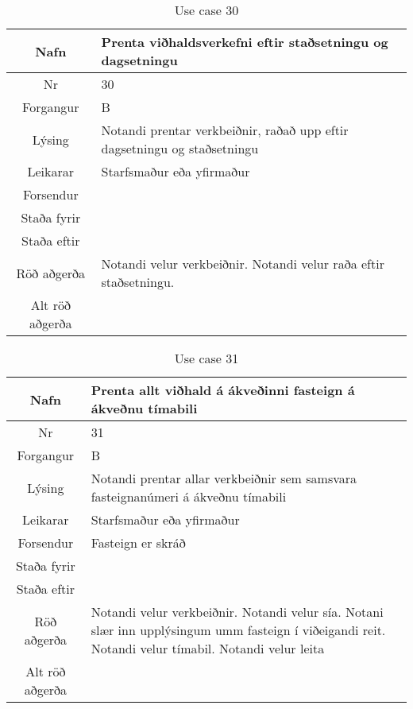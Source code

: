 \begin{table}[h!]\centering
\begin{tabular}{|c|p{10cm}|}
\hline
Nafn&Prenta viðhaldsverkefni eftir staðsetningu og dagsetningu\\
\hline
Nr&30\\
\hline
Forgangur&B\\
\hline
Lýsing&Notandi prentar verkbeiðnir, raðað upp eftir dagsetningu og staðsetningu\\
\hline
Leikarar&Starfsmaður eða yfirmaður\\
\hline
Forsendur&\\
\hline
Staða fyrir&\\
\hline
Staða eftir&\\
\hline
Röð aðgerða&Notandi velur verkbeiðnir. Notandi velur raða eftir staðsetningu.\\
\hline
Alt röð aðgerða&\\
\hline
\end{tabular}
\caption{Use case 30}\label{tab:use_case_30}
\end{table}
\begin{table}[h!]\centering
\begin{tabular}{|c|p{10cm}|}
\hline
Nafn&Prenta allt viðhald á ákveðinni fasteign á ákveðnu tímabili\\
\hline
Nr&31\\
\hline
Forgangur&B\\
\hline
Lýsing&Notandi prentar allar verkbeiðnir sem samsvara fasteignanúmeri á ákveðnu tímabili\\
\hline
Leikarar&Starfsmaður eða yfirmaður\\
\hline
Forsendur&Fasteign er skráð\\
\hline
Staða fyrir&\\
\hline
Staða eftir&\\
\hline
Röð aðgerða&Notandi velur verkbeiðnir. Notandi velur sía. Notani slær inn upplýsingum umm fasteign í viðeigandi reit. Notandi velur tímabil. Notandi velur leita\\
\hline
Alt röð aðgerða&\\
\hline
\end{tabular}
\caption{Use case 31}\label{tab:use_case_31}
\end{table}
